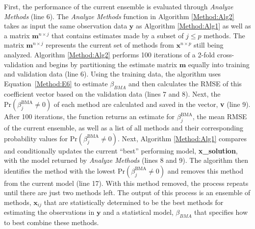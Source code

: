 \documentclass[journal=jpcbfk, manuscript=article]{achemso}
\newcommand{\+}[1]{\ensuremath{\mathbf{#1}}}
\newcommand{\rev}[1]{#1}
\begin{document}
First, the performance of the current ensemble is evaluated through \emph{Analyze Methods} (line 6).
\rev{The \emph{Analyze Methods} function in Algorithm \ref{Method:Alg2} takes as input the same observation data $\textbf{y}$ as Algorithm \ref{Method:Alg1} as well as a matrix  $\textbf{m}^{n \times j}$ that contains estimates made by a subset of $j \leq p$ methods.
The matrix $\textbf{m}^{n \times j}$ represents the current set of methods from $\textbf{x}^{n \times p}$ still being analyzed.}
Algorithm \ref{Method:Alg2} performs 100 iterations of a 2-fold cross-validation and begins by partitioning the estimate matrix $\mathbf{m}$ equally into training and validation data (line 6).
Using the training data, the algorithm uses Equation~\ref{Method:E6} to estimate $\beta_{BMA}$ and then calculates the RMSE of this coefficient vector based on the validation data (lines 7 and 8).
Next, the $\mathrm{Pr}(\beta_j^{\text{BMA}}\neq 0)$ of each method are calculated and saved in the vector, \textbf{v} (line 9).
\rev{After 100 iterations, the function returns an estimate for $\beta_j^{\text{BMA}}$, the mean RMSE of the current ensemble, as well as a list of all methods and their corresponding probability values for $\mathrm{Pr}(\beta_j^{\text{BMA}}\neq 0)$.}
Next, Algorithm \ref{Method:Alg1} compares and conditionally updates the current ``best'' performing model, \textbf{x\_solution}, with the model returned by \emph{Analyze Methods} (lines 8 and 9).
The algorithm then identifies the method with the lowest $\mathrm{Pr} (\beta_j^{\text{BMA}}\neq 0)$ and removes this method from the current model (line 17). With this method removed, the process repeats until there are just two methods left.
The output of this process is an ensemble of methods, $\textbf{x}_{ij}$ that are statistically determined to be the best methods for estimating the observations in $\mathbf{y}$ and a statistical model, $\beta_{BMA}$ that specifies how to best combine these methods.  
\end{document}
